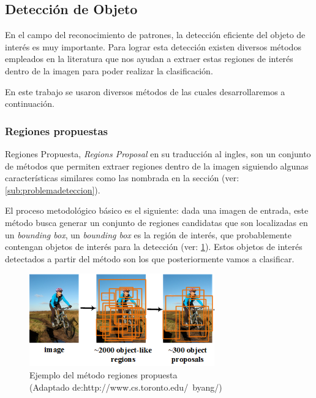 \subsection{Detección de Objeto}\label{sub: detecciondeobjeto}
En el campo del reconocimiento de patrones, la detección eficiente del objeto de interés es muy importante. Para lograr esta detección existen diversos métodos empleados en la literatura que nos ayudan a extraer estas regiones de interés dentro de la imagen para poder realizar la clasificación. 

En este trabajo se usaron diversos métodos de las cuales desarrollaremos a continuación.

\subsubsection{Regiones propuestas}\label{sub: regionespropuesta}

Regiones Propuesta, \textit{Regions Proposal} en su traducción al ingles, son un conjunto de métodos que permiten extraer regiones dentro de la imagen siguiendo algunas características similares como las nombrada en la sección (ver:\ref{sub:problemadeteccion}). 

El proceso metodológico básico es el siguiente: dada una imagen de entrada, este método busca generar un conjunto de regiones candidatas que son localizadas en un \textit{bounding box}, un \textit{bounding box} es la región de interés, que probablemente contengan objetos de interés para la detección (ver: \ref{Fig: propsalregion}). Estos objetos de interés detectados a partir del método son los que posteriormente vamos a clasificar.

\begin{figure}[H]
 \centering
  \includegraphics[height=4cm,keepaspectratio=true,clip=true]{imagenes/Logos/regionProposal.png}
  \caption{Ejemplo del método regiones propuesta \\ (Adaptado de:{http://www.cs.toronto.edu/~byang/})}
	\label{Fig: propsalregion}
\end{figure}

